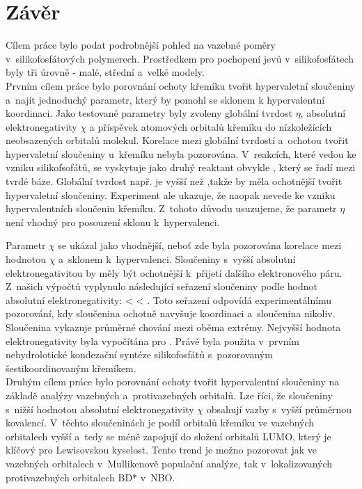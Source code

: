 \documentclass[
digital, %
table,   %
lof,     %
lot,     %
oneside,
]{fithesis3}
\begin{document}
\chapter{Závěr}
Cílem práce bylo podat podrobnější pohled na vazebné poměry v~silikofosfátových polymerech. Prostředkem pro pochopení jevů v~silikofosfátech byly tři úrovně - malé, střední a~velké modely. \\

Prvním cílem práce bylo porovnání ochoty křemíku tvořit hypervaletní sloučeniny a~najít jednoduchý parametr, který by pomohl se sklonem k hypervalentní koordinaci. Jako testované parametry byly zvoleny globální tvrdost $\eta$, absolutní elektronegativity $\chi$ a příspěvek atomových orbitalů křemíku do nízkoležících neobsazených orbitalů molekul.
Korelace mezi globální tvrdostí a~ochotou tvořit hypervaletní sloučeniny u~křemíku nebyla pozorována. V~reakcích, které vedou ke vzniku silikofsofátů, se vyskytuje jako druhý reaktant obvykle , který se řadí mezi tvrdé báze. Globální tvrdost např.  je vyšší než ,takže by měla ochotnější tvořit hypervaletní sloučeniny. Experiment ale ukazuje, že  naopak nevede ke vzniku hypervalentních sloučenin křemíku. Z~tohoto důvodu usuzujeme, že parametr $\eta$ není vhodný pro posouzení sklonu k~hypervalenci.

Parametr $\chi$ se ukázal jako vhodnější, neboť zde byla pozorována korelace mezi hodnotou $\chi$ a~sklonem k~hypervalenci. Sloučeniny s~vyšší absolutní elektronegativitou by měly být ochotnější k~přijetí dalšího elektronového páru. Z~našich výpočtů vyplynulo následující seřazení sloučeniny podle hodnot absolutní elektronegativity:  <  < . Toto seřazení odpovídá experimentálnímu pozorování, kdy sloučenina  ochotně navyšuje koordinaci a~sloučenina  nikoliv. Sloučenina  vykazuje průměrné chování mezi oběma extrémy. Nejvyšší hodnota elektronegativity byla vypočítána pro . Právě  byla použita v~prvním nehydrolotické kondezační syntéze silikofosfátů s~pozorovaným šestikoordinovaným křemíkem.\\

Druhým cílem práce bylo porovnání ochoty tvořit hypervalentní sloučeniny na základě analýzy vazebných a~protivazebných orbitalů. Lze říci, že sloučeniny s~nižší hodnotou absolutní elektronegativity $\chi$ obsahují vazby s~vyšší průměrnou kovalencí. V~těchto sloučeninách je podíl orbitalů křemíku ve vazebných orbitalech vyšší a~tedy se méně zapojují do složení orbitalů LUMO, který je klíčový pro Lewisovskou kyselost. Tento trend je možno pozorovat jak ve vazebných orbitalech v~Mullikenově populační analýze, tak v~lokalizovaných protivazebných orbitalech BD* v~NBO.\\
\end{document}
